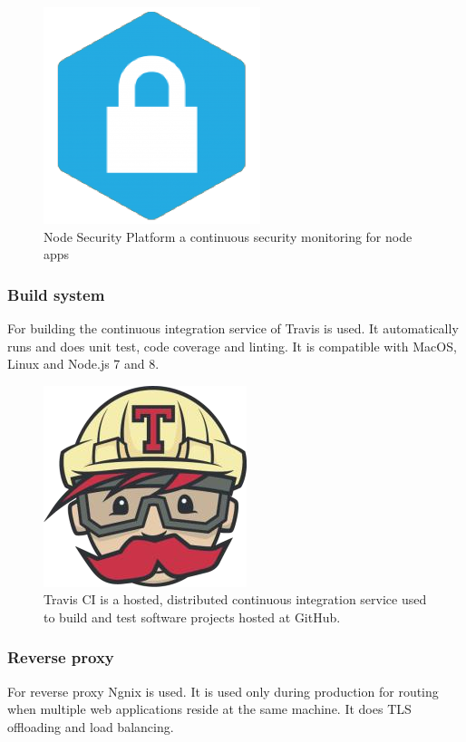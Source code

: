 \begin{figure}[h]
  \begin{center}
    \includegraphics[scale=0.2]{./images/security.png}
    \caption{Node Security Platform a continuous security monitoring for node apps}
    \label{fig:}
  \end{center}
\end{figure}

\subsubsection{Build system}
For building the continuous integration service of Travis is used. It automatically runs and does unit test, code coverage and linting. It is compatible with MacOS, Linux and Node.js 7 and 8.

\begin{figure}[h]
  \begin{center}
    \includegraphics[scale=0.3]{./images/travis.png}
    \caption{Travis CI is a hosted, distributed continuous integration service used to build and test software projects hosted at GitHub.}
    \label{fig:}
  \end{center}
\end{figure}

\subsubsection{Reverse proxy}
For reverse proxy Ngnix is used. It is used only during production for routing when multiple web applications reside at the same machine. It does TLS offloading and load balancing.

